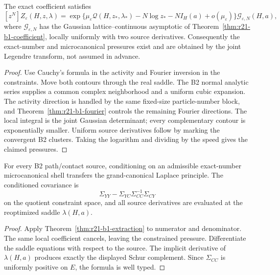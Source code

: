 \begin{theorem}
\label{thm:r21-b1-extraction}
The exact coefficient satisfies
\[
 [z^N]Z_\varepsilon(H,z,\lambda)
 =\exp\{\mu_\varepsilon\mathcal Q(H,z_*,\lambda_*)
       -N\log z_* -N I_H(a)+o(\mu_\varepsilon)\}
 \mathcal G_{\varepsilon,N}(H,a),
\]
where $\mathcal G_{\varepsilon,N}$ has the Gaussian lattice--continuous
asymptotic of Theorem~\ref{thm:r21-b1-coefficient}, locally uniformly with two
source derivatives.  Consequently the exact-number and microcanonical
pressures exist and are obtained by the joint Legendre transform, not assumed
in advance.
\end{theorem}

\begin{proof}
Use Cauchy's formula in the activity and Fourier inversion in the constraints.
Move both contours through the real saddle.  The B2 normal analytic series
supplies a common complex neighborhood and a uniform cubic expansion.  The
activity direction is handled by the same fixed-size particle-number block,
and Theorem~\ref{thm:r21-b1-fourier} controls the remaining Fourier directions.
The local integral is the joint Gaussian determinant; every complementary
contour is exponentially smaller.  Uniform source derivatives follow by
marking the convergent B2 clusters.  Taking the logarithm and dividing by the
speed gives the claimed pressures.
\end{proof}

\begin{corollary}
\label{cor:r21-b1-transfer}
For every B2 path/contact source, conditioning on an admissible exact-number
microcanonical shell transfers the grand-canonical Laplace principle.  The
conditioned covariance is
\[
 \Sigma_{YY}-\Sigma_{YC}\Sigma_{CC}^{-1}\Sigma_{CY}
\]
on the quotient constraint space, and all source derivatives are evaluated at
the reoptimized saddle $\lambda(H,a)$.
\end{corollary}

\begin{proof}
Apply Theorem~\ref{thm:r21-b1-extraction} to numerator and denominator.  The
same local coefficient cancels, leaving the constrained pressure.  Differentiate
the saddle equations with respect to the source.  The implicit derivative of
$\lambda(H,a)$ produces exactly the displayed Schur complement.  Since
$\Sigma_{CC}$ is uniformly positive on $E$, the formula is well typed.
\end{proof}

